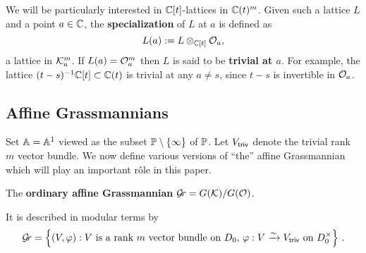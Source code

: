 \documentclass[draft]{article}
\begin{document}
We will be particularly interested in $\CC[t]$-lattices in $ \CC(t)^m$. 
Given such a lattice $ L $ and a point $ a \in \CC$, the \textbf{specialization} of $ L $ at $ a $ is defined as
$$
L(a) := L \otimes_{\CC[t]} \cO_a, 
$$
a lattice in $\cK_a^m$. 
If 
$L(a) = \cO_a^m$ then $L$ is said to be \textbf{trivial at $a$}. 
For example, the lattice $(t-s)^{-1}\CC[t] \subset \CC(t)$ is trivial at any $a\ne s$, since $ t-s $ is invertible in $ \cO_a$. 






\subsection{Affine Grassmannians} 
\label{ss:affgrs}
Set $\AA = \AA^1$ viewed as the subset $\PP\setminus \{\infty\}$ of $\PP$. Let $\Vtriv$ denote the trivial rank $ m $ vector bundle. 
% 
We now define various versions of ``the'' affine Grassmannian which will play an important r\^ole in this paper.

\begin{definition}
\label{def:gr}
     The \textbf{ordinary affine Grassmannian} $\Gr = G(\cK)/G(\cO)$.
\end{definition}    
It is described in modular terms by 
$$
\Gr = 
    \left\{ 
        (V, \varphi) : \text{$V$ is a rank $m$ vector bundle on $ D_0 $, $\varphi : V \xrightarrow{\sim} \Vtriv $ on $ D_0^\times $} 
    \right\} \,. 
$$
\end{document}
